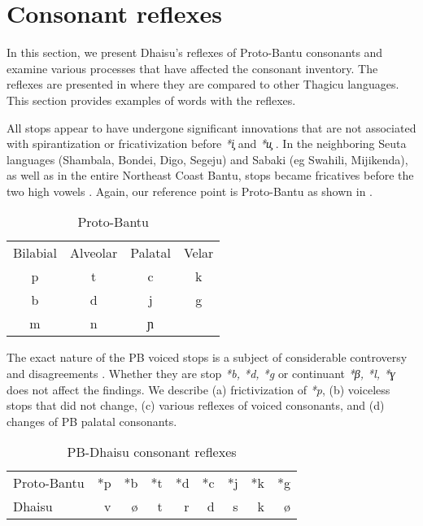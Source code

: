\documentclass[output=paper,colorlinks,citecolor=brown]{langscibook}
\begin{document}
\section{Consonant reflexes}\label{sec:ngonyani:5}

In this section, we present Dhaisu's reflexes of Proto-Bantu consonants and examine various processes that have affected the consonant inventory. The reflexes are presented in \citet[204]{Nurse1982} where they are compared to other Thagicu languages. This section provides examples of words with the reflexes. 

All stops  appear to have undergone significant innovations that are not associated with spirantization or fricativization before \textit{*i̧ }and \textit{*u̧} \citep{Nurse1982,Nurse2000}. In the neighboring Seuta languages (Shambala, Bondei, Digo, Segeju) and Sabaki (eg Swahili, Mijikenda), as well as in the entire Northeast Coast Bantu, stops became fricatives before the two high vowels \citep{NurseHinnebusch1993}. Again, our reference point is Proto-Bantu as shown in . 

\begin{table}
	\caption{Proto-Bantu \cite[83]{Meeussen1967}}
	\label{tab:ngonyani:17}
    \begin{tabular}{@{}c c c c@{}}
    	Bilabial & Alveolar & Palatal & Velar\\
    	p & t & c & k\\
    	b & d & j & g\\
    	m & n & ɲ &   \\
    \end{tabular}
\end{table}

The exact nature of the PB voiced stops is a subject of considerable controversy and disagreements \citep{Hyman2019, Mould1972}. Whether they are stop \textit{*b, *d, *g} \citep{Guthrie1967, Meeussen1967, Meinhof1932}  or continuant \textit{*β, *l, *ɣ} \citep{Meinhof1932}  does not affect the findings. We describe (a) frictivization of \textit{*p}, (b) voiceless stops that did not change, (c) various reflexes of voiced consonants, and (d) changes of PB palatal consonants.

\begin{table}
    \caption{PB-Dhaisu consonant reflexes}
    \label{tab:ngonyani:18}
    \begin{tabular}{@{}l r r r r r r r r@{}}
         Proto-Bantu & *p & *b & *t & *d & *c & *j & *k & *g\\
         Dhaisu & v & ø & t & r & d & s & k & ø \\
    \end{tabular}
\end{table}
\end{document}
